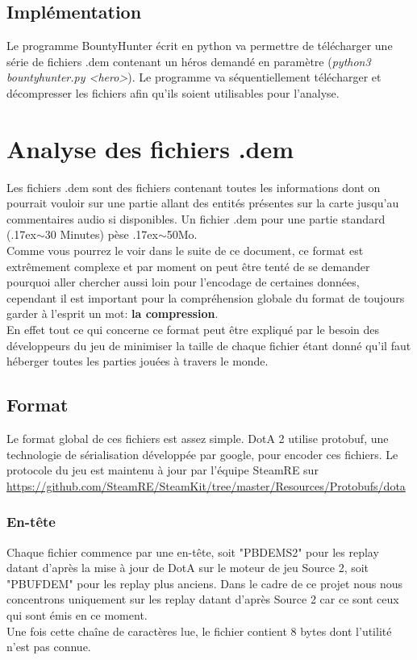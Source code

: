 \documentclass{article}
\begin{document}
\subsection{Implémentation}

Le programme BountyHunter écrit en python va permettre de télécharger une série de fichiers .dem contenant un héros demandé en paramètre (\textit{python3 bountyhunter.py <hero>}). Le programme va séquentiellement télécharger et décompresser les fichiers afin qu'ils soient utilisables pour l'analyse.

\section{Analyse des fichiers .dem}

Les fichiers .dem sont des fichiers contenant toutes les informations dont on pourrait vouloir sur une partie allant des entités présentes sur la carte jusqu'au commentaires audio si disponibles. Un fichier .dem pour une partie standard ({\raise.17ex\hbox{$\scriptstyle\mathtt{\sim}$}}30 Minutes) pèse {\raise.17ex\hbox{$\scriptstyle\mathtt{\sim}$}}50Mo.\\
Comme vous pourrez le voir dans le suite de ce document, ce format est extrêmement complexe et par moment on peut être tenté de se demander pourquoi aller chercher aussi loin pour l'encodage de certaines données, cependant il est important pour la compréhension globale du format de toujours garder à l'esprit un mot: \textbf{la compression}.\\
En effet tout ce qui concerne ce format peut être expliqué par le besoin des développeurs du jeu de minimiser la taille de chaque fichier étant donné qu'il faut héberger toutes les parties jouées à travers le monde. 

\subsection{Format}

Le format global de ces fichiers est assez simple. DotA 2 utilise protobuf, une technologie de sérialisation développée par google, pour encoder ces fichiers. Le protocole du jeu est maintenu à jour par l'équipe SteamRE sur \url{https://github.com/SteamRE/SteamKit/tree/master/Resources/Protobufs/dota} \\

\subsubsection{En-tête}
Chaque fichier commence par une en-tête, soit "PBDEMS2" pour les replay datant d'après la mise à jour de DotA sur le moteur de jeu Source 2, soit "PBUFDEM" pour les replay plus anciens. Dans le cadre de ce projet nous nous concentrons uniquement sur les replay datant d'après Source 2 car ce sont ceux qui sont émis en ce moment.\\
Une fois cette chaîne de caractères lue, le fichier contient 8 bytes dont l'utilité n'est pas connue.\\
\newpage
\end{document}
